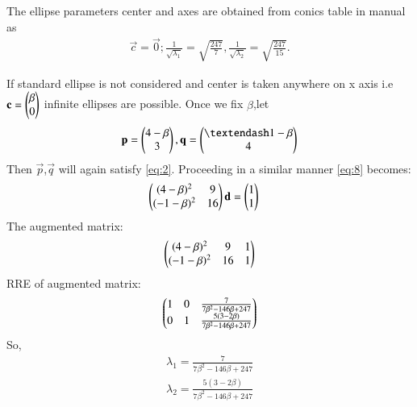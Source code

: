 \documentclass[journal,12pt,twocolumn]{IEEEtran}
\begin{document}
The ellipse parameters center and axes are obtained from conics table in manual as
\begin{align}
\vec{c} = \vec{0};
\frac{1}{\sqrt{\lambda_1}}  = \sqrt{\frac{247}{7}},
\frac{1}{\sqrt{\lambda_2}}  = \sqrt{\frac{247}{15}}.
\end{align}

If standard ellipse is not considered and center is taken anywhere on x axis i.e
$\mathbf{c}=\begin{pmatrix}\beta\\0\end{pmatrix}$ infinite ellipses are possible.
Once we fix $\beta$,let
\begin{align}
\vec{p} = \myvec{4-\beta\\3} , \vec{q} = \myvec{– 1-\beta\\4}
\end{align}
Then $\vec{p}$,$\vec{q}$ will again satisfy \eqref{eq:2}.
Proceeding in a similar manner \eqref{eq:8} becomes:
\begin{align}
\begin{pmatrix}(4-\beta)^2 & 9\\ (-1-\beta)^2 & 16\end{pmatrix}\mathbf{d} &= \begin{pmatrix}1\\1\end{pmatrix}
\end{align}
The augmented matrix:
\begin{align}
    \begin{pmatrix}(4-\beta)^2 & 9&1\\ (-1-\beta)^2 & 16&1\end{pmatrix}
\end{align}
RRE of augmented matrix:
\begin{align}
    \begin{pmatrix}1&0&\frac{7}{7\beta^2-146\beta+247}\\0&1&\frac{5(3-2\beta)}{7\beta^2-146\beta+247}\end{pmatrix}
\end{align}
So,
\begin{align}
    \lambda_1=\frac{7}{7\beta^2-146\beta+247}\label{eq:18}\\
    \lambda_2=\frac{5(3-2\beta)}{7\beta^2-146\beta+247}\label{eq:19}
\end{align}
\end{document}
